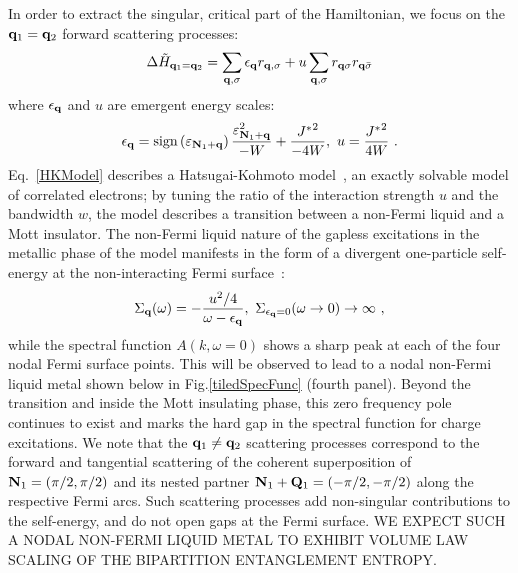 \documentclass[reprint,hidelinks,onecolumn]{revtex4-2}
\begin{document}
In order to extract the singular, critical part of the Hamiltonian, we focus on the \({\bf q}_1 = {\bf q}_2\) forward scattering processes:
\begin{equation}\begin{aligned}\label{HKModel}
	\Delta \tilde H_{{\bf q}_1 = {\bf q}_2} = \sum_{{\bf q},\sigma}\epsilon_{{\bf q}}{r}_{{\bf q},\sigma} + u\sum_{{\bf q}, \sigma}r_{{\bf q} \sigma} r_{{\bf q} \bar\sigma}
\end{aligned}\end{equation}
where \(\epsilon_{\bf q}\) and \(u\) are emergent energy scales:
\begin{equation}\begin{aligned}
	\epsilon_{\bf q} = \text{sign}\left(\varepsilon_{{\bf N}_1 + {\bf q}}\right)\frac{\varepsilon_{{\bf N}_1 + {\bf q}}^2}{-W} + \frac{{J^*}^2}{-4W},~u = \frac{{J^*}^2}{4W}~.
\end{aligned}\end{equation}
Eq.~\ref{HKModel} describes a Hatsugai-Kohmoto model~\cite{Baskaran1991,Hatsugai1992}, an exactly solvable model of correlated electrons; by tuning the ratio of the interaction strength \(u\) and the bandwidth \(w\), the model describes a transition between a non-Fermi liquid and a Mott insulator. The non-Fermi liquid nature of the gapless excitations in the metallic phase of the model manifests in the form of a divergent one-particle self-energy at the non-interacting Fermi surface~\cite{Phillips2020}:
\begin{equation}\begin{aligned}
	\Sigma_{{\bf q}}(\omega) = -\frac{u^2/4}{\omega - \epsilon_{\bf q}}, ~\Sigma_{\epsilon_{\bf q}=0}(\omega \to 0)  \to \infty~,
\end{aligned}\end{equation}
while the spectral function $A(k,\omega=0)$ shows a sharp peak at each of the four nodal Fermi surface points. This will be observed to lead to a nodal non-Fermi liquid metal shown below in Fig.\ref{tiledSpecFunc} (fourth panel). Beyond the transition and inside the Mott insulating phase, this zero frequency pole continues to exist and marks the hard gap in the spectral function for charge excitations. We note that the ${\bf q}_{1}\neq {\bf q}_{2}$ scattering processes correspond to the forward and tangential scattering of the coherent superposition of \({\bf N}_1 = \left(\pi/2, \pi/2\right)\) and its nested partner \({\bf N}_1 + {\bf Q}_1 = \left(-\pi/2, -\pi/2\right)\) along the respective Fermi arcs. Such scattering processes add non-singular contributions to the self-energy, and do not open gaps at the Fermi surface. WE EXPECT SUCH A NODAL NON-FERMI LIQUID METAL TO EXHIBIT VOLUME LAW SCALING OF THE BIPARTITION ENTANGLEMENT ENTROPY. 
\end{document}
